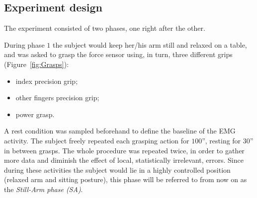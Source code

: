 \documentclass[10pt]{bmc_article}
\def\texttt{[image: ]}
\newenvironment{bmcformat}{\begin{raggedright}\baselineskip20pt\sloppy\setboolean{publ}{false}}{\end{raggedright}\baselineskip20pt\sloppy}
\begin{document}
\begin{bmcformat}

\subsection*{Experiment design}

The experiment consisted of two phases, one right after the
other.

During phase $1$ the subject would keep her/his arm still and relaxed
on a table, and was asked to grasp the force sensor using, in turn,
three different grips (Figure~\ref{fig:Grasps}):

\begin{itemize}
  \item index precision grip;
  \item other fingers precision grip;
  \item power grasp.
\end{itemize}


A rest condition was sampled beforehand to define the baseline of the
EMG activity. The subject freely repeated each grasping action for
$100$'', resting for $30$'' in between grasps. The whole procedure was
repeated twice, in order to gather more data and diminish the effect
of local, statistically irrelevant, errors. Since during these
activities the subject would lie in a highly controlled position
(relaxed arm and sitting posture), this phase will
be referred to from now on as the \emph{Still-Arm phase (SA)}.


\end{bmcformat}
\end{document}
